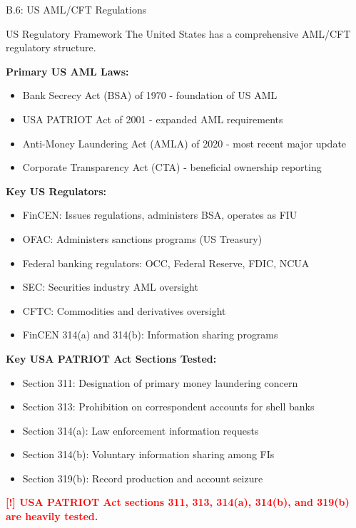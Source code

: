 \documentclass[11pt,a4paper]{beamer}
\newcommand{\redflag}[1]{\textcolor{red}{\textbf{[!] #1}}}
\begin{document}
	\begin{frame}{B.6: US AML/CFT Regulations}
		\begin{block}{US Regulatory Framework}
			The United States has a comprehensive AML/CFT regulatory structure.
		\end{block}
		\textbf{Primary US AML Laws:}
		\begin{itemize}
			\item Bank Secrecy Act (BSA) of 1970 - foundation of US AML
			\item USA PATRIOT Act of 2001 - expanded AML requirements
			\item Anti-Money Laundering Act (AMLA) of 2020 - most recent major update
			\item Corporate Transparency Act (CTA) - beneficial ownership reporting
		\end{itemize}
		\textbf{Key US Regulators:}
		\begin{itemize}
			\item FinCEN: Issues regulations, administers BSA, operates as FIU
			\item OFAC: Administers sanctions programs (US Treasury)
			\item Federal banking regulators: OCC, Federal Reserve, FDIC, NCUA
			\item SEC: Securities industry AML oversight
			\item CFTC: Commodities and derivatives oversight
			\item FinCEN 314(a) and 314(b): Information sharing programs
		\end{itemize}
		\textbf{Key USA PATRIOT Act Sections Tested:}
		\begin{itemize}
			\item Section 311: Designation of primary money laundering concern
			\item Section 313: Prohibition on correspondent accounts for shell banks
			\item Section 314(a): Law enforcement information requests
			\item Section 314(b): Voluntary information sharing among FIs
			\item Section 319(b): Record production and account seizure
		\end{itemize}
		\redflag{USA PATRIOT Act sections 311, 313, 314(a), 314(b), and 319(b) are heavily tested.}
	\end{frame}
	
\end{document}
